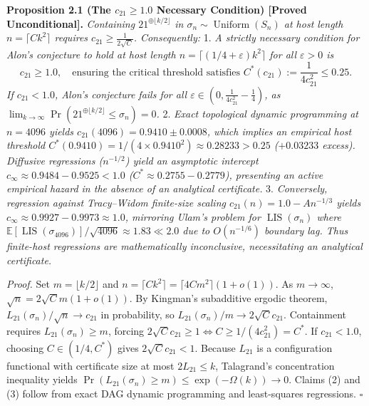 \documentclass[
  11pt,
]{article}
\begin{document}
\textbf{Proposition 2.1 (The \(c_{21} \ge 1.0\) Necessary Condition) [Proved Unconditional].}
\emph{Containing \(21^{\oplus \lfloor k/2 \rfloor}\) in
\(\sigma_n \sim \operatorname{Uniform}(S_n)\) at host length
\(n = \lceil C k^2 \rceil\) requires \(c_{21} \ge \frac{1}{2\sqrt{C}}\).
Consequently:} 1. \emph{A strictly necessary condition for Alon's
conjecture to hold at host length
\(n = \lceil(1/4+\varepsilon)k^2\rceil\) for all \(\varepsilon > 0\) is}
\[
   c_{21} \ge 1.0, \quad \text{ensuring the critical threshold satisfies } C^*(c_{21}) := \frac{1}{4 c_{21}^2} \le 0.25.
   \] \emph{If \(c_{21} < 1.0\), Alon's conjecture fails for all
\(\varepsilon \in \left(0, \frac{1}{4 c_{21}^2} - \frac{1}{4}\right)\),
as
\(\lim_{k \to \infty} \Pr(21^{\oplus \lfloor k/2 \rfloor} \le \sigma_n) = 0\).}
2. \emph{Exact topological dynamic programming at \(n = 4096\) yields
\(c_{21}(4096) = 0.9410 \pm 0.0008\), which implies an empirical host
threshold \(C^*(0.9410) = 1/(4 \times 0.9410^2) \approx 0.28233 > 0.25\)
(\(+0.03233\) excess). Diffusive regressions (\(n^{-1/2}\)) yield an
asymptotic intercept \(c_\infty \approx 0.9484 - 0.9525 < 1.0\)
(\(C^* \approx 0.2755 - 0.2779\)), presenting an active empirical hazard
in the absence of an analytical certificate.} 3. \emph{Conversely,
regression against Tracy--Widom finite-size scaling
\(c_{21}(n) = 1.0 - A n^{-1/3}\) yields
\(c_\infty \approx 0.9927 - 0.9973 \approx 1.0\), mirroring Ulam's
problem for \(\operatorname{LIS}(\sigma_n)\) where
\(\mathbb{E}[\operatorname{LIS}(\sigma_{4096})]/\sqrt{4096} \approx 1.83 \ll 2.0\)
due to \(O(n^{-1/6})\) boundary lag. Thus finite-host regressions are
mathematically inconclusive, necessitating an analytical certificate.}

\emph{Proof.} Set \(m = \lfloor k/2 \rfloor\) and
\(n = \lceil C k^2 \rceil = \lceil 4 C m^2 \rceil (1+o(1))\). As
\(m \to \infty\), \(\sqrt{n} = 2\sqrt{C} m (1+o(1))\). By Kingman's
subadditive ergodic theorem, \(L_{21}(\sigma_n)/\sqrt{n} \to c_{21}\) in
probability, so \(L_{21}(\sigma_n)/m \to 2\sqrt{C} c_{21}\). Containment
requires \(L_{21}(\sigma_n) \ge m\), forcing
\(2\sqrt{C} c_{21} \ge 1 \iff C \ge 1/(4 c_{21}^2) = C^*\). If
\(c_{21} < 1.0\), choosing \(C \in (1/4, C^*)\) gives
\(2\sqrt{C} c_{21} < 1\). Because \(L_{21}\) is a configuration
functional with certificate size at most \(2 L_{21} \le k\), Talagrand's
concentration inequality yields
\(\Pr(L_{21}(\sigma_n) \ge m) \le \exp(-\Omega(k)) \to 0\). Claims (2)
and (3) follow from exact DAG dynamic programming and least-squares
regressions. \(\square\)
\end{document}
